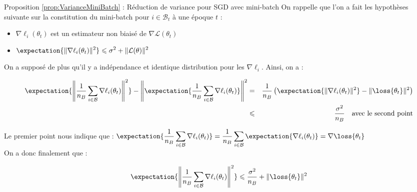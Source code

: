 \documentclass{beamer}
\begin{document}
\begin{frame}{}{Proposition \ref{prop:VarianceMiniBatch} : Réduction de variance pour SGD avec mini-batch}
	On rappelle que l'on a fait les hypothèses suivante sur la constitution du mini-batch pour $i\in \mathcal{B}_t$ à une époque $t$ :
	\begin{itemize}
		\item $\displaystyle \nabla \ell_{i}(\theta_t)$ est un estimateur non biaisé de $\nabla \mathcal{L}(\theta_t)$
		\item $\displaystyle \expectation{\|\nabla \ell_i(\theta_t)\|^2} \leqslant \sigma^2 + \|\mathcal{L}(\theta)\|^2$
	\end{itemize}
	
	On a supposé de plus qu'il y a indépendance et identique distribution pour les $\nabla\ell_i$. Ainsi, on a :
	
	\begin{eqnarray*}
		\expectation{\left\|\frac{1}{n_B}\sum_{i\in\mathcal{B}}\nabla\ell_i(\theta_t)\right\|^2} - \left\|\expectation{\frac{1}{n_B}\sum_{i\in\mathcal{B}}\nabla\ell_i(\theta_t)}\right\|^2 &=& \frac{1}{n_B}\left(\expectation{\|\nabla\ell_i(\theta_t)\|^2} - \|\loss{\theta_t}\|^2\right)\\
		&\leqslant& \frac{\sigma^2}{n_B} \quad \text{avec le second point}
	\end{eqnarray*}
	
	Le premier point nous indique que :  $\displaystyle \expectation{\frac{1}{n_B}\sum_{i\in\mathcal{B}}\nabla\ell_i(\theta_t)} = \frac{1}{n_B}\sum_{i\in\mathcal{B}} \expectation{\nabla\ell_i(\theta_t)} = \nabla \loss{\theta_t}$\\
	On a donc finalement que :
	
	\begin{equation*}
		\expectation{\left\|\frac{1}{n_B}\sum_{i\in\mathcal{B}}\nabla\ell_i(\theta_t)\right\|^2} \leqslant \frac{\sigma^2}{n_B} + \|\loss{\theta_t}\|^2
	\end{equation*}
\end{frame}
\end{document}
